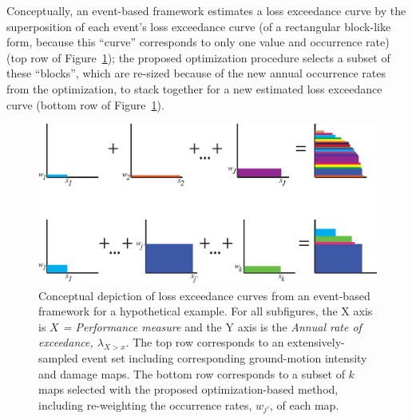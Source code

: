 Conceptually, an event-based framework estimates a loss exceedance curve by the superposition of each event's loss exceedance curve (of a rectangular block-like form, because this ``curve'' corresponds to only one value and occurrence rate) (top row of Figure~\ref{fig:blocks}); the proposed optimization procedure selects a subset of these ``blocks'', which are re-sized because of the new annual occurrence rates from the optimization, to stack together for a new estimated loss exceedance curve (bottom row of Figure~\ref{fig:blocks}).


\begin{figure}[h]
    \includegraphics[width=\textwidth]{../FIGS/subset_blocks.eps} 
\caption{Conceptual depiction of loss exceedance curves from an event-based framework for a hypothetical example. For all subfigures, the X axis is \emph{$X$ = Performance measure} and the Y axis is the \emph{Annual rate of exceedance, $\lambda_{X>x}$}. The top row corresponds to an extensively-sampled event set including corresponding ground-motion intensity and damage maps. The bottom row corresponds to a subset of $k$ maps selected with the proposed optimization-based method, including re-weighting the occurrence rates, $w_{j'}$, of each map.}
\label{fig:blocks}
\end{figure}

